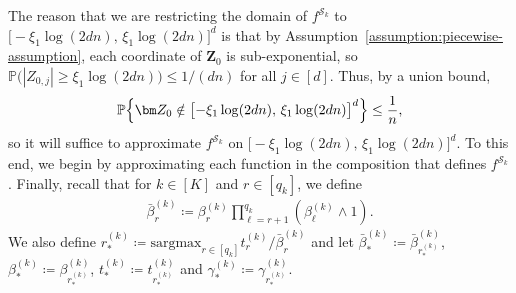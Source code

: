 \documentclass[12pt]{article}
\begin{document}
The reason that we are restricting the domain of $f^{\mathcal{S}_k}$ to $\bigl[-\xi_1\log(2dn),\,\xi_1\log(2dn)\bigr]^d$ is that by Assumption~\ref{assumption:piecewise-assumption}, each coordinate of $\bm Z_0$ is sub-exponential, so $\mathbb{P}\bigl(|Z_{0,j}| \geq \xi_1\log(2dn)\bigr) \leq 1/(dn)$ for all $j\in[d]$. Thus, by a union bound,
\begin{align}
    \mathbb{P}\Bigl\{ \bm Z_0 \notin \bigl[-\xi_1\log(2dn),\,\xi_1\log(2dn)\bigr]^d \Bigr\} \leq \frac{1}{n}, \label{eq:truncate-Z}
\end{align}
so it will suffice to approximate $f^{\mathcal{S}_k}$ on $\bigl[-\xi_1\log(2dn),\,\xi_1\log(2dn)\bigr]^d$.  To this end, we begin by approximating each function in the composition that defines $f^{\mathcal{S}_k}$. Finally, recall that for $k\in[K]$ and $r\in[q_k]$, we define
\begin{align*}
    \bar{\beta}^{(k)}_r \coloneqq \beta^{(k)}_{r} \prod_{\ell=r+1}^{q_k} (\beta^{(k)}_{\ell} \wedge 1). 
\end{align*}
We also define $r_*^{(k)} \coloneqq \mathrm{sargmax}_{r\in[q_k]} t^{(k)}_r / \bar{\beta}^{(k)}_r$ and let $\bar\beta^{(k)}_* \coloneqq \bar\beta^{(k)}_{r_*^{(k)}}$, $\beta^{(k)}_* \coloneqq \beta^{(k)}_{r_*^{(k)}}$, $t^{(k)}_* \coloneqq t^{(k)}_{r_*^{(k)}}$ and $\gamma_*^{(k)} \coloneqq \gamma^{(k)}_{r_*^{(k)}}$.
\end{document}
